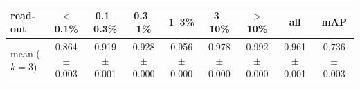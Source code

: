 \begin{tabular}{lcccccccc}
\toprule
read-out & $<$0.1\% & 0.1--0.3\% & 0.3--1\% & 1--3\% & 3--10\% & $>$10\% & all & mAP \\
\midrule
mean ($k=3$) & 0.864 $\pm$ 0.003 & 0.919 $\pm$ 0.001 & 0.928 $\pm$ 0.000 & 0.956 $\pm$ 0.000 & 0.978 $\pm$ 0.000 & 0.992 $\pm$ 0.000 & 0.961 $\pm$ 0.001 & 0.736 $\pm$ 0.003 \\
\bottomrule
\end{tabular}
